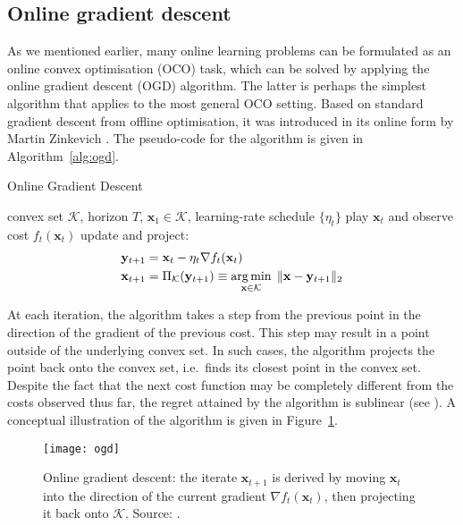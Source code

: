 \subsection{Online gradient descent}

As we mentioned earlier, many online learning problems can be formulated as an online convex optimisation (OCO) task, which can be solved by applying the online gradient descent (OGD) algorithm. The latter is perhaps the simplest algorithm that applies to the most general OCO setting. Based on standard gradient descent from offline optimisation, it was introduced in its online form by Martin Zinkevich \citep{ogd}. The pseudo-code for the algorithm is given in Algorithm~\ref{alg:ogd}.
\begin{algorithm}[H]
  \caption{Online Gradient Descent}
\label{alg:ogd}
  \begin{algorithmic}[1]
     convex set $\mathcal{K}$, horizon $T$, $\mathbf{x}_1 \in \mathcal{K}$, learning-rate schedule $\{\eta_t\}$
      \STATE play $\mathbf{x}_t$ and observe cost $f_{t}(\mathbf{x}_t)$
      \STATE update and project:
      \begin{align*}
      	\mathbf{y}_{t+1} &= \mathbf{x}_t - \eta_t \nabla f_{t}(\mathbf{x}_t) \\
      	\mathbf{x}_{t+1} &= \Pi_{\mathcal{K}}(\mathbf{y}_{t+1}) \equiv \operatorname*{arg\,min}_{\mathbf{x} \in \mathcal{K}} \; \Vert\mathbf{x} - \mathbf{y}_{t+1}\Vert_2
      \end{align*}
    \ENDFOR
  \end{algorithmic}
\end{algorithm}

At each iteration, the algorithm takes a step from the previous point in the direction of the gradient of the previous cost. This step may result in a point outside of the underlying convex set. In such cases, the algorithm projects the point back onto the convex set, i.e.\ finds its closest point in the convex set. Despite the fact that the next cost function may be completely different from the costs observed thus far, the regret attained by the algorithm is sublinear (see \citep[Theorem~3.1.]{oco}). A conceptual illustration of the algorithm is given in Figure~\ref{fig:ogd}.
\begin{figure}[t]
	\texttt{[image: ogd]}
	\caption{Online gradient descent: the iterate $\mathbf{x}_{t+1}$ is derived by moving $\mathbf{x}_t$ into the direction of the current gradient $\nabla f_t(\mathbf{x}_t)$, then projecting it back onto $\mathcal{K}$. Source: \citep{oco}.}
	\label{fig:ogd}
\end{figure}

